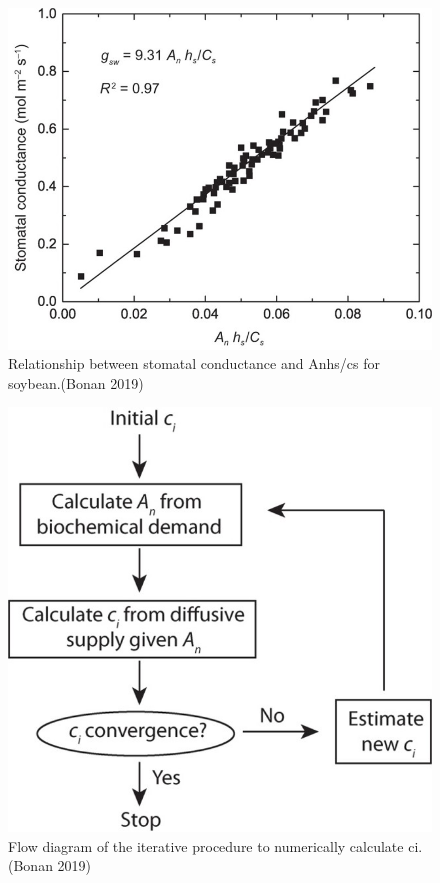 \documentclass[12pt,oneside]{book}
\begin{document}
\begin{figure}

{\centering \includegraphics[width=0.8\linewidth]{figures/chap2/ball_berry} 

}

\caption{Relationship between stomatal conductance and Anhs/cs for soybean.(Bonan 2019)}\label{fig:f213}
\end{figure}

\begin{figure}

{\centering \includegraphics[width=0.8\linewidth]{figures/chap2/numerical_solution} 

}

\caption{Flow diagram of the iterative procedure to numerically calculate ci.(Bonan 2019)}\label{fig:f214}
\end{figure}
\end{document}
